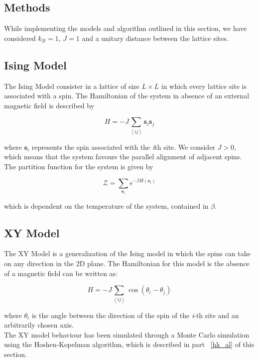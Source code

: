 \documentclass[twoside]{article}
\def\mean#1{\left< #1 \right>}
\begin{document}
\begin{multicols}{2}
\section{Methods}
While implementing the models and algorithm outlined in this section, we have considered $k_B = 1$, $J = 1$ and a unitary distance between the lattice sites.

\subsection{Ising Model}
The Ising Model consister in a lattice of size $L \times L$ in which every lattice site is associated with a spin. The Hamiltonian of the system in absence of an external magnetic field is described by

\begin{equation}
\label{ising_hamiltonian}
H = - J \sum_{\mean{ij}} \textbf{s}_i \textbf{s}_j
\end{equation}

where $\textbf{s}_i$ represents the spin associated with the \emph{i}th site.
We consider $J > 0$, which means that the system favours the parallel alignment of adjacent spins.
The partition function for the system is given by 

\begin{equation}
\mathcal{Z} = \sum_{\textbf{s}_i} e^{-\beta H\left(\textbf{s}_i\right)}
\end{equation}

which is dependent on the temperature of the system, contained in $\beta$.

\subsection{XY Model}
The XY Model is a generalization of the Ising model in which the spins can take on any direction in the 2D plane. The Hamiltonian for this model is the absence of a magnetic field can be written as:

\begin{equation}
H = -J \sum_{\mean{ij}} \cos(\theta_i - \theta_j)
\end{equation}

where $\theta_i$ is the angle between the direction of the spin of the \emph{i}-th site and an arbitrarily chosen axis. \\
The XY model behaviour has been simulated through a Monte Carlo simulation using the Hoshen-Kopelman algorithm, which is described in part ~\ref{hk_al} of this section.


\end{multicols}
\end{document}
